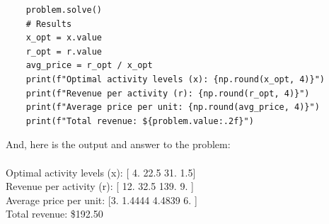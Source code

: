 \documentclass{article}
\begin{document}
\begin{itemize}
\begin{lstlisting}
    problem.solve()
    # Results
    x_opt = x.value
    r_opt = r.value
    avg_price = r_opt / x_opt
    print(f"Optimal activity levels (x): {np.round(x_opt, 4)}")
    print(f"Revenue per activity (r): {np.round(r_opt, 4)}")
    print(f"Average price per unit: {np.round(avg_price, 4)}")
    print(f"Total revenue: ${problem.value:.2f}")
  \end{lstlisting}
  And, here is the output and answer to the problem: \\
  \phantom{} \\
  Optimal activity levels (x): [ 4.  22.5 31.   1.5] \\
  Revenue per activity (r): [ 12.   32.5 139.    9. ] \\
  Average price per unit: [3.     1.4444 4.4839 6.    ] \\
  Total revenue: \$192.50
\end{itemize}
\end{document}
